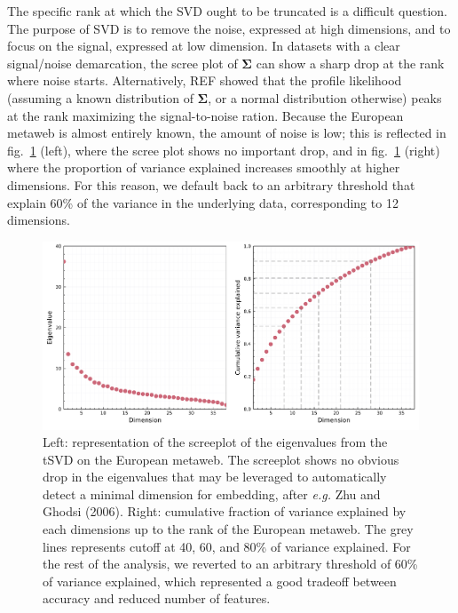 \documentclass[11pt]{article}
\makeatletter
\def\maxwidth{\ifdim\Gin@nat@width>\linewidth\linewidth
\else\Gin@nat@width\fi}
\let\Oldincludegraphics\includegraphics
\renewcommand{\includegraphics}[1]{\Oldincludegraphics[width=\maxwidth]{#1}}
\makeatother
\begin{document}
The specific rank at which the SVD ought to be truncated is a difficult
question. The purpose of SVD is to remove the noise, expressed at high
dimensions, and to focus on the signal, expressed at low dimension. In
datasets with a clear signal/noise demarcation, the scree plot of
\(\mathbf{\Sigma}\) can show a sharp drop at the rank where noise
starts. Alternatively, REF showed that the profile likelihood (assuming
a known distribution of \(\mathbf{\Sigma}\), or a normal distribution
otherwise) peaks at the rank maximizing the signal-to-noise ration.
Because the European metaweb is almost entirely known, the amount of
noise is low; this is reflected in fig.~\ref{fig:scree} (left), where
the scree plot shows no important drop, and in fig.~\ref{fig:scree}
(right) where the proportion of variance explained increases smoothly at
higher dimensions. For this reason, we default back to an arbitrary
threshold that explain 60\% of the variance in the underlying data,
corresponding to 12 dimensions.

\begin{figure}
\hypertarget{fig:scree}{%
\centering
\includegraphics{figures/figure-screeplot.png}
\caption{Left: representation of the screeplot of the eigenvalues from
the tSVD on the European metaweb. The screeplot shows no obvious drop in
the eigenvalues that may be leveraged to automatically detect a minimal
dimension for embedding, after \emph{e.g.} Zhu and Ghodsi (2006). Right:
cumulative fraction of variance explained by each dimensions up to the
rank of the European metaweb. The grey lines represents cutoff at 40,
60, and 80\% of variance explained. For the rest of the analysis, we
reverted to an arbitrary threshold of 60\% of variance explained, which
represented a good tradeoff between accuracy and reduced number of
features.}\label{fig:scree}
}
\end{figure}
\end{document}
